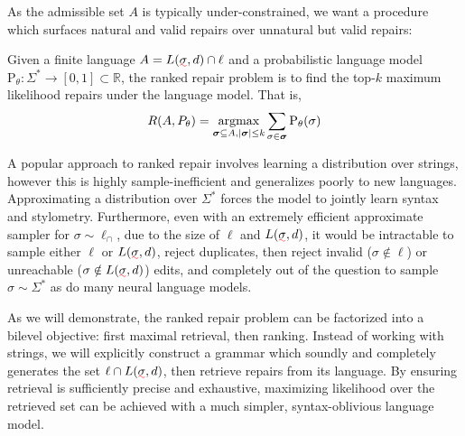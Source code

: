 \documentclass[sigplan,review,acmsmall,nonacm,anonymous]{acmart}\settopmatter{printfolios=false,printccs=false,printacmref=false}
\begin{document}
%

  As the admissible set $A$ is typically under-constrained, we want a procedure which surfaces natural and valid repairs over unnatural but valid repairs:

  \begin{definition}\label{def:ranked-repair}
    Given a finite language $A = L(\err\sigma, d) \cap \ell$ and a probabilistic language model $\text{P}_\theta: \Sigma^* \rightarrow [0, 1] \subset \mathbb{R}$, the ranked repair problem is to find the top-$k$ maximum likelihood repairs under the language model. That is,
    \begin{equation}
      R(A, P_\theta) = \operatorname*{argmax}_{\bm{\sigma} \subseteq A, |\bm{\sigma}| \leq k} \sum_{\sigma \in \bm{\sigma}}\text{P}_\theta(\sigma)
    \end{equation}
  \end{definition}

  A popular approach to ranked repair involves learning a distribution over strings, however this is highly sample-inefficient and generalizes poorly to new languages. Approximating a distribution over $\Sigma^*$ forces the model to jointly learn syntax and stylometry. Furthermore, even with an extremely efficient approximate sampler for $\sigma \sim \ell_\cap$, due to the size of $\ell$ and $L(\err\sigma, d)$, it would be intractable to sample either $\ell$ or $L(\err\sigma, d)$, reject duplicates, then reject invalid ($\sigma \notin \ell$) or unreachable ($\sigma \notin L(\err\sigma, d)$) edits, and completely out of the question to sample $\sigma \sim \Sigma^*$ as do many neural language models.

  As we will demonstrate, the ranked repair problem can be factorized into a bilevel objective: first maximal retrieval, then ranking. Instead of working with strings, we will explicitly construct a grammar which soundly and completely generates the set $\ell \cap L(\err\sigma, d)$, then retrieve repairs from its language. By ensuring retrieval is sufficiently precise and exhaustive, maximizing likelihood over the retrieved set can be achieved with a much simpler, syntax-oblivious language model.
\end{document}
